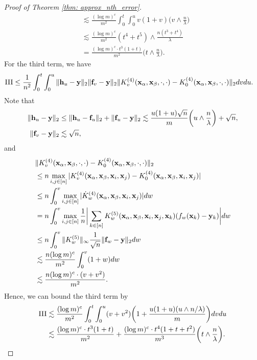 \begin{proof}[Proof of Theorem \ref{thm: approx_nth_error}]
\begin{align*}
		& \lesssim \frac{(\log m)^c}{m^2} \int_0^t \int_0^u v(1+v) \bigg(v \land \frac{n}{\lambda}\bigg)  \\
		& \lesssim \frac{(\log m)^c}{m^2} (t^4 +t^5) \land \frac{n (t^3 + t^4)}{\lambda}\\
		& = \frac{(\log m)^c\cdot t^3(1+t)}{m^2} \bigg(t \land \frac{n}{\lambda}\bigg) .
	\end{align*}
	For the third term, we have
	\begin{align*}
		\RN{3} & \leq \frac{1}{n^2} \int_0^t \int_0^u \|\rvh_u - \rvy \|_2 \| \rvf_v-\rvy\|_2 \|\KKKK_v(\rvx_\alpha, \rvx_\beta, \cdot, \cdot) - \KKKK_0(\rvx_\alpha, \rvx_\beta, \cdot, \cdot) \|_2 dvdu.
	\end{align*}
	Note that 
	\begin{align*}
		\| {\mathbf{h}}_u -{\mathbf{y}}\|_2&  \leq \|{\mathbf{h}}_u -{\mathbf{f}}_u \|_2 + \| {\mathbf{f}}_u -{\mathbf{y}}\|_2 \lesssim \frac{u(1+u)\sqrt{n}}{m}\bigg(u \land \frac{n}{\lambda}\bigg) + \sqrt{n},\\
		\| {\mathbf{f}}_v- {\mathbf{y}}\|_2 & \lesssim \sqrt{n},
	\end{align*}	
	and
	\begin{align*}
		& \|{K}^{(4)}_v({\mathbf{x}}_\alpha, {\mathbf{x}}_\beta, \cdot, \cdot) - {K}^{(4)}_0({\mathbf{x}}_\alpha, {\mathbf{x}}_\beta, \cdot, \cdot) \|_2\\	
		& \leq n \max_{i, j\in[n]}|{K}^{(4)}_v({\mathbf{x}}_\alpha, {\mathbf{x}}_\beta, {\mathbf{x}}_i, {\mathbf{x}}_j) - {K}^{(4)}_0({\mathbf{x}}_\alpha, {\mathbf{x}}_\beta, {\mathbf{x}}_i, {\mathbf{x}}_j)|\\
		& \leq n \int_0^v \max_{i, j\in[n]}| \dot{K}_w^{(4)}({\mathbf{x}}_\alpha, {\mathbf{x}}_\beta, {\mathbf{x}}_i, {\mathbf{x}}_j)| dw\\
		& = n\int_0^v \max_{i, j\in[n]} \frac{1}{n} \bigg|\sum_{k\in[n]} K^{(5)}_w({\mathbf{x}}_\alpha, {\mathbf{x}}_\beta, {\mathbf{x}}_i, {\mathbf{x}}_j, {\mathbf{x}}_k) (f_w({\mathbf{x}}_k) - {\mathbf{y}}_k)\bigg| dw\\
		& \leq n \int_0^v \| K^{(5)}_w\|_\infty \frac{1}{\sqrt{n}}  \| {\mathbf{f}}_w - {\mathbf{y}}\|_2 dw\\
		& \lesssim \frac{n(\log m)^c}{m^2}\int_0^v  (1+w) dw\\
		& \lesssim \frac{n(\log m)^c\cdot (v+ v^2)}{m^2} .
	\end{align*}
	Hence, we can bound the third term by
	\begin{align*}
		\RN{3} & \lesssim \frac{(\log m)^c}{m^2} \int_0^t \int_0^u (v+v^2) \bigg(1 + \frac{u(1+u)(u \land n/\lambda)}{m}\bigg) dvdu\\
		& \lesssim  \frac{(\log m)^c \cdot t^3(1+t)}{m^2} +  \frac{(\log m)^c \cdot t^4(1+t+t^2)}{m^3}  \bigg(t \land \frac{n}{\lambda}\bigg).
	\end{align*}

\end{proof}
